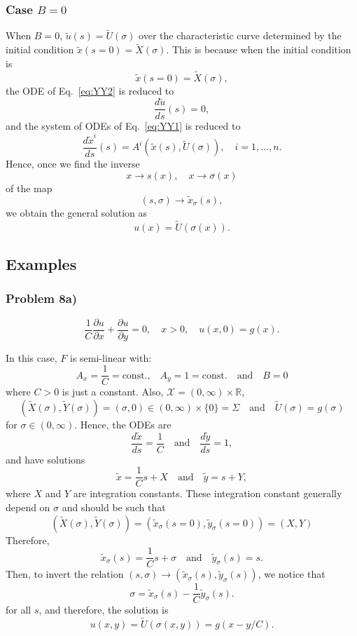 \documentclass[11pt,spanish]{article}
\newcommand{\RR}{\mathbb{R}}
\begin{document}
\subsubsection{Case $B=0$}

When $B=0$, $\tilde u(s)=\tilde U(\sigma)$ over the characteristic curve determined by the initial condition $\tilde x(s=0)=\tilde X(\sigma)$.
This is because when the initial condition is
$$
\tilde x(s=0) = \tilde X(\sigma),
$$
the ODE of Eq.~\ref{eq:YY2} is reduced to
$$
\frac{d \tilde u}{ds}(s) = 0,
$$
and the system of ODEs of Eq.~\ref{eq:YY1} is reduced to
$$
\frac{d\tilde x^i}{ds}(s)
=
A^i(\tilde x(s),\tilde U(\sigma)),
\quad
i=1,...,n.
$$
Hence, once we find the inverse
$$
x\to s(x),\quad x\to \sigma(x)
$$
of the map
$$
(s,\sigma) \to \tilde x_{\sigma}(s),
$$
we obtain the general solution as
$$
u(x) = \tilde U(\sigma(x)).
$$

\subsection{Examples}

\subsubsection{Problem 8a)}

$$
\displaystyle \frac{1}{C}\frac{\partial u}{\partial x} + \frac{\partial u}{\partial y} = 0,\quad x>0,\quad u(x,0)=g(x).
$$

In this case, $F$ is semi-linear with:
$$
A_x = \frac{1}{C} = \text{const.,}
\quad
A_y = 1 = \text{const.}
\quad
\text{and}
\quad
B = 0
$$
where $C>0$ is just a constant.
Also, $\mathcal X = (0,\infty)\times \RR$,
$$
(\tilde X(\sigma) , \tilde Y(\sigma))
= 
(\sigma,0) \in (0,\infty)\times \{0\} = \Sigma
\quad
\text{and}
\quad
\tilde U(\sigma) = g(\sigma)
$$
for $\sigma\in (0,\infty)$.
Hence, the ODEs are
$$
\frac{d\tilde x}{ds}
=
\frac{1}{C}
\quad
\text{and}
\quad
\frac{d\tilde y}{ds}
=
1,
$$
and have solutions
$$
\tilde x = \frac{1}{C} s + X
\quad
\text{and}
\quad
\tilde y = s + Y,
$$
where $X$ and $Y$ are integration constants.
These integration constant generally depend on $\sigma$ and should be such that
$$ 
( \tilde X(\sigma),\tilde Y(\sigma) )
=
(\tilde{x}_{\sigma}(s=0),\tilde{y}_{\sigma}(s=0)) 
= 
(X,Y)
$$
Therefore,
$$
\tilde x_{\sigma}(s)
=
\frac{1}{C}s + \sigma
\quad
\text{and}
\quad
\tilde y_{\sigma}(s) = s.
$$
Then, to invert the relation $(s,\sigma)\to (\tilde x_{\sigma}(s),\tilde y_{\sigma}(s))$, we notice that
$$
\sigma = \tilde x_{\sigma}(s) - \frac{1}{C}\tilde y_{\sigma}(s).
$$
for all $s$, and therefore, the solution is
$$
u(x,y)
=
\tilde U(\sigma(x,y))
=
g(x-y/C).
$$
\end{document}
